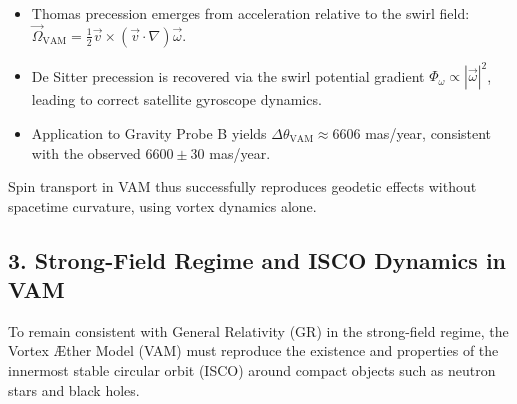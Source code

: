\begin{itemize}
    \item Thomas precession emerges from acceleration relative to the swirl field: \( \vec{\Omega}_\text{VAM} = \frac{1}{2} \vec{v} \times (\vec{v} \cdot \nabla) \vec{\omega} \).
    \item De Sitter precession is recovered via the swirl potential gradient \( \Phi_\omega \propto |\vec{\omega}|^2 \), leading to correct satellite gyroscope dynamics.
    \item Application to Gravity Probe B yields \( \Delta\theta_\text{VAM} \approx 6606 \) mas/year, consistent with the observed \( 6600 \pm 30 \) mas/year.
\end{itemize}

Spin transport in VAM thus successfully reproduces geodetic effects without spacetime curvature, using vortex dynamics alone.


\subsection*{3. Strong-Field Regime and ISCO Dynamics in VAM}

To remain consistent with General Relativity (GR) in the strong-field regime, the Vortex Æther Model (VAM) must reproduce the existence and properties of the innermost stable circular orbit (ISCO) around compact objects such as neutron stars and black holes.

